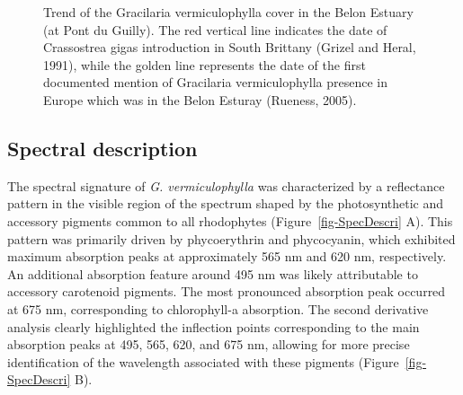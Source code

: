 \documentclass[
  letterpaper,
  DIV=11,
  numbers=noendperiod]{scrartcl}
\begin{document}
\label{cell-fig-HistoricalPlot}
\begin{figure}[H]


\caption{\label{fig-HistoricalPlot}Trend of the Gracilaria
vermiculophylla cover in the Belon Estuary (at Pont du Guilly). The red
vertical line indicates the date of Crassostrea gigas introduction in
South Brittany (Grizel and Heral, 1991), while the golden line
represents the date of the first documented mention of Gracilaria
vermiculophylla presence in Europe which was in the Belon Esturay
(Rueness, 2005).}

\end{figure}%

\subsection{Spectral description}\label{spectral-description}

The spectral signature of \emph{G. vermiculophylla} was characterized by
a reflectance pattern in the visible region of the spectrum shaped by
the photosynthetic and accessory pigments common to all rhodophytes
(Figure~\ref{fig-SpecDescri} A). This pattern was primarily driven by
phycoerythrin and phycocyanin, which exhibited maximum absorption peaks
at approximately 565 nm and 620 nm, respectively. An additional
absorption feature around 495 nm was likely attributable to accessory
carotenoid pigments. The most pronounced absorption peak occurred at 675
nm, corresponding to chlorophyll-a absorption. The second derivative
analysis clearly highlighted the inflection points corresponding to the
main absorption peaks at 495, 565, 620, and 675 nm, allowing for more
precise identification of the wavelength associated with these pigments
(Figure~\ref{fig-SpecDescri} B).
\end{document}
